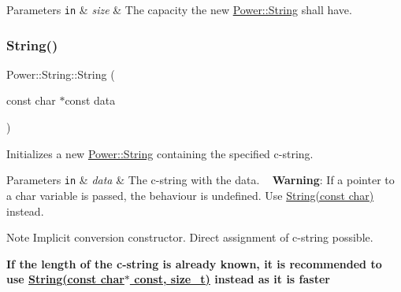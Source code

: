\begin{DoxyParams}[1]{Parameters}
\mbox{\tt in}  & {\em size} & The capacity the new \hyperlink{class_power_1_1_string}{Power\+::\+String} shall have. \\
\hline
\end{DoxyParams}
\mbox{\label{class_power_1_1_string_aec63a74130e5abc89a1556115942a5e1}} 
\subsubsection{\texorpdfstring{String()}{String()}\hspace{0.1cm}{\footnotesize\ttfamily [3/7]}}
{\footnotesize\ttfamily Power\+::\+String\+::\+String (\begin{DoxyParamCaption}\item[{const char $\ast$const}]{data }\end{DoxyParamCaption})\hspace{0.3cm}{\ttfamily [inline]}}



Initializes a new \hyperlink{class_power_1_1_string}{Power\+::\+String} containing the specified c-\/string. 


\begin{DoxyParams}[1]{Parameters}
\mbox{\tt in}  & {\em data} & The c-\/string with the data. ~\newline
 {\bfseries Warning}\+: If a pointer to a char variable is passed, the behaviour is undefined. Use \hyperlink{class_power_1_1_string_ad14954dc3dfbdee2196a5298fe176632}{String(const char)} instead. \\
\hline
\end{DoxyParams}
\begin{DoxyNote}{Note}
Implicit conversion constructor. Direct assignment of c-\/string possible. 

{\bfseries If the length of the c-\/string is already known, it is recommended to use \hyperlink{class_power_1_1_string_a01efecde6ea0a7f3f37750a4a1b15dcd}{String(const char$\ast$ const, size\+\_\+t)} instead as it is faster} 
\end{DoxyNote}
\mbox{\label{class_power_1_1_string_ad14954dc3dfbdee2196a5298fe176632}} 

